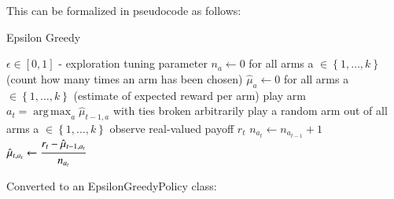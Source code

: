 \documentclass[nojss]{jss}\usepackage[]{graphicx}\usepackage[]{color}
\DeclareMathOperator*{\argmax}{arg\,max}
\begin{document}
This can be formalized in pseudocode as follows:

\begin{algorithm}[H]
\caption{Epsilon Greedy}
\label{Alg:EpsilonGreedy}
\begin{algorithmic}
\REQUIRE \(    \epsilon  \in \left[ 0,1 \right] \) - exploration tuning parameter
\STATE \( n_{a} \leftarrow 0 \) for all arms a \(  \in \left\{ 1, \dots, k \right\} \)  (count how many times an arm has been chosen)
\STATE \( \hat{\mu}_{a} \leftarrow 0 \) for all arms a  \(   \in \left\{ 1, \dots, k \right\} \)  (estimate of expected reward per arm)
		\STATE play arm \(a_t = \argmax_a  \hat{\mu}_{t-1,a}  \) with ties broken arbitrarily
	\ELSE
		\STATE play a random arm out of all arms a \(  \in \left\{ 1, \dots, k \right\} \)
	\ENDIF
	\STATE observe real-valued payoff $r_t$
	\STATE \( n_{a_{t}} \leftarrow n_{a_{t-1}} + 1  \)
   \STATE \( \hat{\mu}_{t,a_{t}} \leftarrow   \cfrac{r_t - \hat{\mu}_{t-1,a_{t}} }{n_{a_{t}}}   \)
\ENDFOR
\end{algorithmic}
\end{algorithm}

Converted to an EpsilonGreedyPolicy class:
\end{document}
